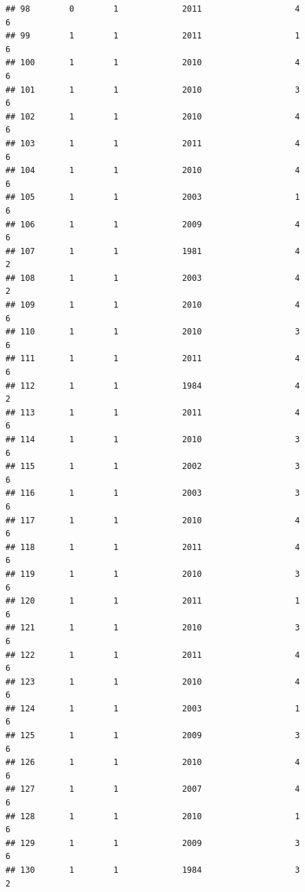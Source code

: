 \documentclass[
]{article}
\begin{document}
\begin{verbatim}
## 98        0        1             2011                   4                 6
## 99        1        1             2011                   1                 6
## 100       1        1             2010                   4                 6
## 101       1        1             2010                   3                 6
## 102       1        1             2010                   4                 6
## 103       1        1             2011                   4                 6
## 104       1        1             2010                   4                 6
## 105       1        1             2003                   1                 6
## 106       1        1             2009                   4                 6
## 107       1        1             1981                   4                 2
## 108       1        1             2003                   4                 2
## 109       1        1             2010                   4                 6
## 110       1        1             2010                   3                 6
## 111       1        1             2011                   4                 6
## 112       1        1             1984                   4                 2
## 113       1        1             2011                   4                 6
## 114       1        1             2010                   3                 6
## 115       1        1             2002                   3                 6
## 116       1        1             2003                   3                 6
## 117       1        1             2010                   4                 6
## 118       1        1             2011                   4                 6
## 119       1        1             2010                   3                 6
## 120       1        1             2011                   1                 6
## 121       1        1             2010                   3                 6
## 122       1        1             2011                   4                 6
## 123       1        1             2010                   4                 6
## 124       1        1             2003                   1                 6
## 125       1        1             2009                   3                 6
## 126       1        1             2010                   4                 6
## 127       1        1             2007                   4                 6
## 128       1        1             2010                   1                 6
## 129       1        1             2009                   3                 6
## 130       1        1             1984                   3                 2

\end{verbatim}
\end{document}
